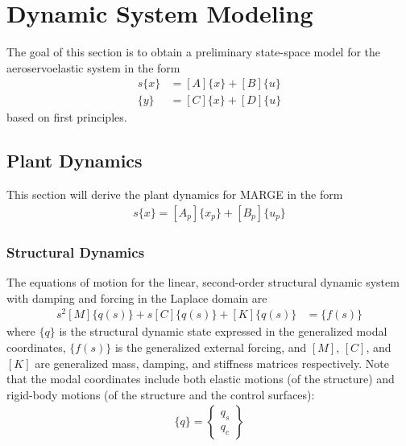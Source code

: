 \chapter{Dynamic System Modeling}
\label{ch:sysModeling}

The goal of this section is to obtain a preliminary state-space model for the aeroservoelastic system in the form
\begin{equation}
	\begin{aligned}
    		s \{x\} &= [A] \{x\} + [B]\{u\} \\
	    \{y\} &= [C] \{x\} + [D] \{u\}
	\end{aligned}
\end{equation}
based on first principles.

\section{Plant Dynamics}

This section will derive the plant dynamics for MARGE in the form
\begin{align}
	\label{eq:ssPlant}
	s \{x\} = [A_p]\{x_p\}+[B_p]\{u_p\}
\end{align}

\subsection{Structural Dynamics}

The equations of motion for the linear, second-order structural dynamic system with damping and forcing in the Laplace domain are
\begin{align}
    s^2 [M] \{q(s)\} + s [C] \{q(s)\} + [K] \{q(s)\} &= \{f(s)\}
\end{align}
where $\{q\}$ is the structural dynamic state expressed in the generalized modal coordinates, $\{f(s)\}$ is the generalized external forcing, and $[M]$, $[C]$, and $[K]$ are generalized mass, damping, and stiffness matrices respectively. Note that the modal coordinates include both elastic motions (of the structure) and rigid-body motions (of the structure and the control surfaces):
\begin{align}
    \{q\} = \begin{Bmatrix} q_{s} \\ q_{c} \end{Bmatrix}
\end{align}

